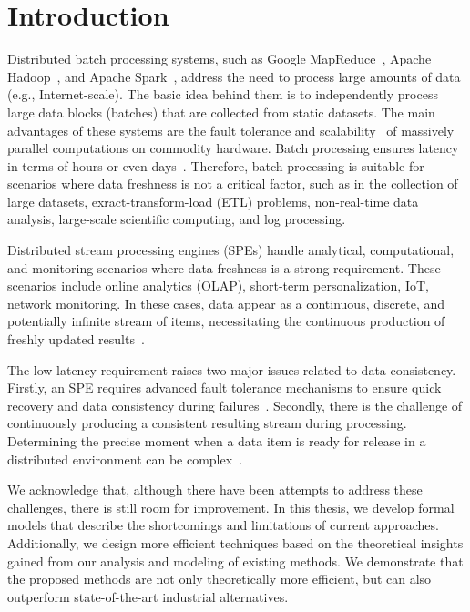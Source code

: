 \chapter{Introduction}

Distributed batch processing systems, such as Google MapReduce~\cite{Dean:2008:MSD:1327452.1327492}, Apache Hadoop~\cite{hadoop2009hadoop}, and Apache Spark~\cite{Zaharia:2016:ASU:3013530.2934664}, address the need to process large amounts of data (e.g., Internet-scale). The basic idea behind them is to independently process large data blocks (batches) that are collected from static datasets. The main advantages of these systems are the fault tolerance and scalability~\cite{borthakur2011apache} of massively parallel computations on commodity hardware. Batch processing ensures latency in terms of hours or even days~\cite{carbone2015apache, chang2014hawq, sun2023survey}. Therefore, batch processing is suitable for scenarios where data freshness is not a critical factor, such as in the collection of large datasets, exract-transform-load (ETL) problems, non-real-time data analysis, large-scale scientific computing, and log processing.

Distributed stream processing engines (SPEs) handle analytical, computational, and monitoring scenarios where data freshness is a strong requirement. These scenarios include online analytics (OLAP), short-term personalization, IoT, network monitoring. In these cases, data appear as a continuous, discrete, and potentially infinite stream of items, necessitating the continuous production of freshly updated results~\cite{fragkoulis2024survey, diro2024anomaly}.

The low latency requirement raises two major issues related to data consistency. Firstly, an SPE requires advanced fault tolerance mechanisms to ensure quick recovery and data consistency during failures~\cite{Wang:2019:LSF:3341301.3359653, akidau2015streaming}. Secondly, there is the challenge of continuously producing a consistent resulting stream during processing. Determining the precise moment when a data item is ready for release in a distributed environment can be complex~\cite{Tucker:2003:EPS:776752.776780, DBLP:journals/pvldb/BegoliACHKKMS21}.

We acknowledge that, although there have been attempts to address these challenges, there is still room for improvement. In this thesis, we develop formal models that describe the shortcomings and limitations of current approaches. Additionally, we design more efficient techniques based on the theoretical insights gained from our analysis and modeling of existing methods. We demonstrate that the proposed methods are not only theoretically more efficient, but can also outperform state-of-the-art industrial alternatives.

